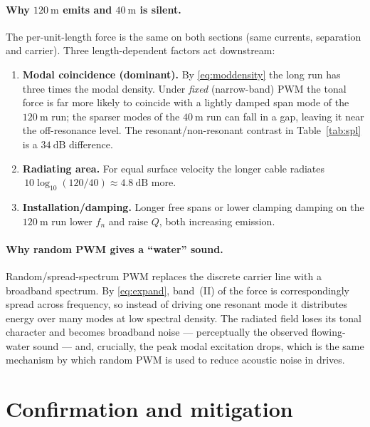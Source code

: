 \documentclass[11pt,a4paper]{article}
\begin{document}
\paragraph{Why $120\ \mathrm{m}$ emits and $40\ \mathrm{m}$ is silent.}
The per-unit-length force is the same on both sections (same currents, separation
and carrier). Three length-dependent factors act downstream:
\begin{enumerate}[leftmargin=*,nosep]
\item \textbf{Modal coincidence (dominant).} By \eqref{eq:moddensity} the long run
has three times the modal density. Under \emph{fixed} (narrow-band) PWM the tonal
force is far more likely to coincide with a lightly damped span mode of the
$120\ \mathrm{m}$ run; the sparser modes of the $40\ \mathrm{m}$ run can fall in a
gap, leaving it near the off-resonance level. The resonant/non-resonant contrast
in Table~\ref{tab:spl} is a $34\ \mathrm{dB}$ difference.
\item \textbf{Radiating area.} For equal surface velocity the longer cable radiates
$\,10\log_{10}(120/40)\approx4.8\ \mathrm{dB}$ more.
\item \textbf{Installation/damping.} Longer free spans or lower clamping damping on
the $120\ \mathrm{m}$ run lower $f_n$ and raise $Q$, both increasing emission.
\end{enumerate}

\paragraph{Why random PWM gives a ``water'' sound.}
Random/spread-spectrum PWM replaces the discrete carrier line with a broadband
spectrum. By \eqref{eq:expand}, band~(II) of the force is correspondingly spread
across frequency, so instead of driving one resonant mode it distributes energy
over many modes at low spectral density. The radiated field loses its tonal
character and becomes broadband noise --- perceptually the observed flowing-water
sound --- and, crucially, the peak modal excitation drops, which is the same
mechanism by which random PWM is used to reduce acoustic noise in drives.

\section{Confirmation and mitigation}
\end{document}
